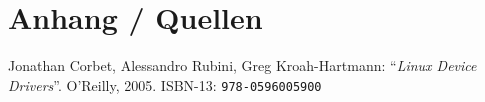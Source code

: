 \section{Anhang / Quellen}


\begin{thebibliography}{1}
Jonathan Corbet, Alessandro Rubini, Greg Kroah-Hartmann:
       \enquote{\sl Linux Device Drivers}. O'Reilly, 2005. ISBN-13: \texttt{978-0596005900}
\end{thebibliography}